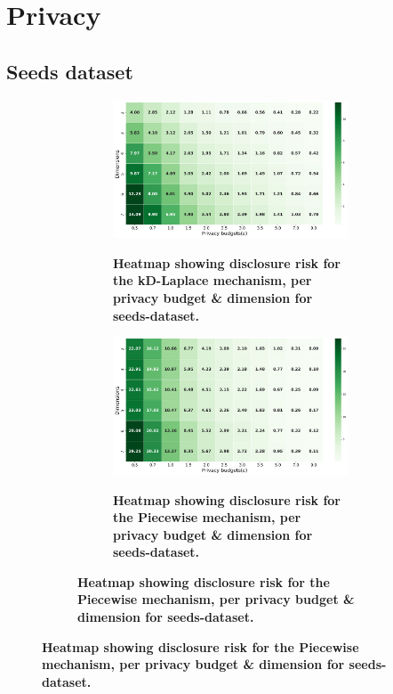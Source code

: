 \section{Privacy} \label{appendix:results-privacy}
\subsection{Seeds dataset} \label{appendix:results-privacy-seeds-dataset}
\begin{figure}[H]
    \centering
    \begin{subfigure}[b]{0.9\textwidth}
        \begin{subfigure}[c]{1\textwidth}
            \caption{\textbf{Heatmap showing disclosure risk for the kD-Laplace mechanism, per privacy budget \& dimension for seeds-dataset.}}
            \includegraphics[width=1\textwidth]{Results/kd-laplace/kd-Laplace/seeds-dataset/distance.png}
            \label{fig:privacy_dist_seeds-dataset_adversial_advantage_kd-laplace}
        \end{subfigure}
        \vfill %

        \begin{subfigure}[c]{1\textwidth}
            \caption{\textbf{Heatmap showing disclosure risk for the Piecewise mechanism, per privacy budget \& dimension for seeds-dataset.}}
            \includegraphics[width=1\textwidth]{Results/kd-laplace/piecewise/seeds-dataset/distance.png}
            \label{fig:privacy_dist_seeds-dataset_adversial_advantage_piecewise}
        \end{subfigure}
    \end{subfigure}
\end{figure}
\newpage

